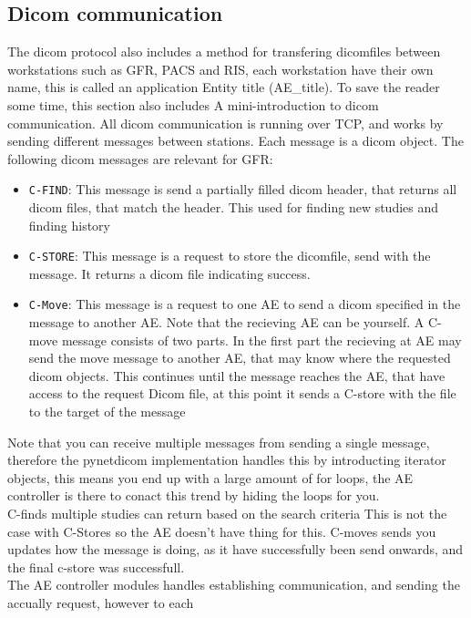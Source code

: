 \documentclass{article}
\begin{document}
\subsection{Dicom communication}
The dicom protocol also includes a method for transfering dicomfiles between workstations such as GFR, PACS and RIS, each workstation have their own name, this is called an application Entity title (AE_title). To save the reader some time, this section also includes
A mini-introduction to dicom communication. All dicom communication is running over TCP, and works by sending different messages between stations. Each message is a dicom object.
The following dicom messages are relevant for GFR:
\begin{itemize}
		\item \texttt{C-FIND}:  This message is send a partially filled dicom header, that returns all dicom files, that match the header. This used for finding new studies and finding history
		\item \texttt{C-STORE}: This message is a request to store the dicomfile, send with the message. It returns a dicom file indicating success.
		\item \texttt{C-Move}:  This message is a request to one AE to send a dicom specified in the message to another AE. Note that the recieving AE can be yourself.
		 A C-move message consists of two parts. In the first part the recieving at AE may send the move message to another AE, that may know where the requested dicom objects.
		 This continues until the message reaches the AE, that have access to the request Dicom file, at this point it sends a C-store with the file to the target of the message
\end{itemize}
Note that you can receive multiple messages from sending a single message, therefore the pynetdicom implementation handles this by introducting iterator objects,
this means you end up with a large amount of for loops, the AE controller is there to conact this trend by hiding the loops for you.\\
C-finds multiple studies can return based on the search criteria This is not the case with C-Stores so the AE doesn't have thing for this.
C-moves sends you updates how the message is doing, as it have successfully been send onwards, and the final c-store was successfull.\\ 
The AE controller modules handles establishing communication, and sending the accually request, however to each 
\end{document}
